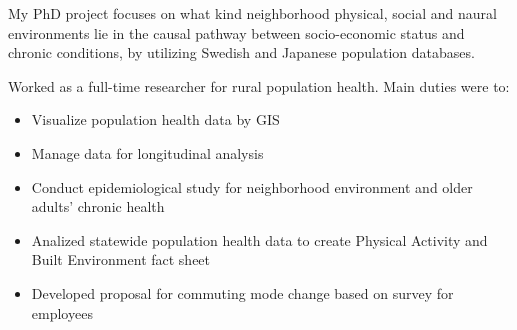 \documentclass[10pt,a4paper,ragged2e]{altacv}
\begin{document}

\begin{fullwidth}
\makecvheader
\end{fullwidth}



My PhD project focuses on what kind neighborhood physical, social and naural environments lie in the causal pathway between socio-economic status and chronic conditions, by utilizing Swedish and Japanese population databases.

\divider

Worked as a full-time researcher for rural population health. Main duties were to:
\begin{itemize}
\item Visualize population health data by GIS
\item Manage data for longitudinal analysis 
\item Conduct epidemiological study for neighborhood environment and older adults' chronic health 
\end{itemize}

\divider

\begin{itemize}
\item Analized statewide population health data to create Physical Activity and Built Environment fact sheet
\item Developed proposal for commuting mode change based on survey for employees
\end{itemize}
\end{document}
